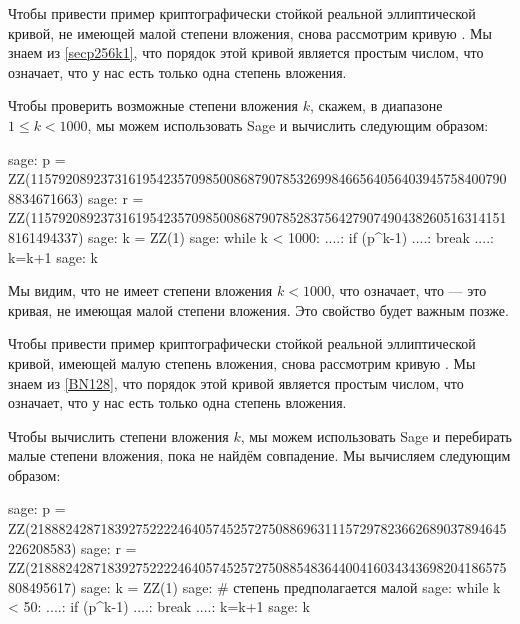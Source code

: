 \begin{example}
\label{ex:pairings_on_secp256k1}
 Чтобы привести пример криптографически стойкой реальной эллиптической кривой, не имеющей малой степени вложения, снова рассмотрим кривую . Мы знаем из \examplename{} \ref{secp256k1}, что порядок этой кривой является простым числом, что означает, что у нас есть только одна степень вложения.

Чтобы проверить возможные степени вложения $k$, скажем, в диапазоне $1\leq k < 1000$, мы можем использовать Sage и вычислить следующим образом:
\begin{sagecommandline}
sage: p = ZZ(115792089237316195423570985008687907853269984665640564039457584007908834671663)
sage: r = ZZ(115792089237316195423570985008687907852837564279074904382605163141518161494337)
sage: k = ZZ(1)
sage: while k < 1000:
....:     if (p^k-1)%
....:         break
....:     k=k+1
sage: k
\end{sagecommandline}
Мы видим, что  не имеет степени вложения $k<1000$, что означает, что  — это кривая, не имеющая малой степени вложения. Это свойство будет важным позже.
\end{example}
\begin{example}
\label{ex:embedding_degre_BN128}
Чтобы привести пример криптографически стойкой реальной эллиптической кривой, имеющей малую степень вложения, снова рассмотрим кривую . Мы знаем из \examplename{} \ref{BN128}, что порядок этой кривой является простым числом, что означает, что у нас есть только одна степень вложения.

Чтобы вычислить степени вложения $k$, мы можем использовать Sage и перебирать малые степени вложения, пока не найдём совпадение. Мы вычисляем следующим образом:
\begin{sagecommandline}
sage: p = ZZ(21888242871839275222246405745257275088696311157297823662689037894645226208583)
sage: r = ZZ(21888242871839275222246405745257275088548364400416034343698204186575808495617)
sage: k = ZZ(1)
sage: # степень предполагается малой
sage: while k < 50: 
....:     if (p^k-1)%
....:         break
....:     k=k+1
sage: k
\end{sagecommandline}
\end{example}



